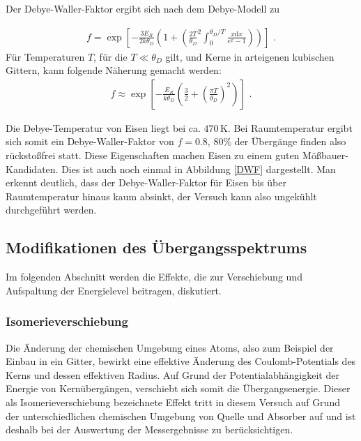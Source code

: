 Der Debye-Waller-Faktor ergibt sich nach dem Debye-Modell zu

\begin{align}
f = \exp\left[ -\frac{3E_R}{2k\theta_D}\left( 1+\left( \frac{2T}{\theta_D}^2 \int_{0}^{\theta_D/T}\frac{x\mathrm{d}x}{e^x-1}\right) \right) \right]\text{ .}
\end{align}
Für Temperaturen $T$, für die $T \ll \theta_D$ gilt, und Kerne in arteigenen kubischen Gittern, kann folgende Näherung gemacht werden:
\begin{align}
f\approx \exp\left[ -\frac{E_R}{k\theta_D} \left(\frac{3}{2} + \left(\frac{\pi T}{\theta_D}\right)^2 \right) \right]\text{ .}
\end{align}

Die Debye-Temperatur von Eisen liegt bei ca. $470 \,\mathrm{K}$. Bei Raumtemperatur ergibt sich somit ein Debye-Waller-Faktor von $f=0.8$, 80\% der Übergänge finden also rückstoßfrei statt. Diese Eigenschaften machen Eisen zu einem guten Mößbauer-Kandidaten. Dies ist auch noch einmal in Abbildung \ref{DWF} dargestellt. Man erkennt deutlich, dass der Debye-Waller-Faktor für Eisen bis über Raumtemperatur hinaus kaum absinkt, der Versuch kann also ungekühlt durchgeführt werden.


\subsection{Modifikationen des Übergangsspektrums}

Im folgenden Abschnitt werden die Effekte, die zur Verschiebung und Aufspaltung der Energielevel beitragen, diskutiert.

\subsubsection{Isomerieverschiebung \label{Isomerie}}

Die Änderung der chemischen Umgebung eines Atoms, also zum Beispiel der Einbau in ein Gitter, bewirkt eine effektive Änderung des Coulomb-Potentials des Kerns und dessen effektiven Radius. Auf Grund der Potentialabhängigkeit der Energie von Kernübergängen, verschiebt sich somit die Übergangsenergie. Dieser als Isomerieverschiebung bezeichnete Effekt tritt in diesem Versuch auf Grund der unterschiedlichen chemischen Umgebung von Quelle und Absorber auf und ist deshalb bei der Auswertung der Messergebnisse zu berücksichtigen.

